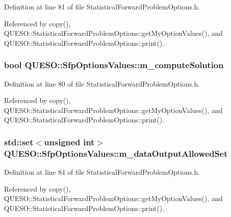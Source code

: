 Definition at line 81 of file Statistical\-Forward\-Problem\-Options.\-h.



Referenced by copy(), Q\-U\-E\-S\-O\-::\-Statistical\-Forward\-Problem\-Options\-::get\-My\-Option\-Values(), and Q\-U\-E\-S\-O\-::\-Statistical\-Forward\-Problem\-Options\-::print().

\hypertarget{class_q_u_e_s_o_1_1_sfp_options_values_a087c7e28e7c72ee99d5722f75e43c8bb}{
\subsubsection[{m\-\_\-compute\-Solution}]{\setlength{\rightskip}{0pt plus 5cm}bool Q\-U\-E\-S\-O\-::\-Sfp\-Options\-Values\-::m\-\_\-compute\-Solution}}\label{class_q_u_e_s_o_1_1_sfp_options_values_a087c7e28e7c72ee99d5722f75e43c8bb}


Definition at line 80 of file Statistical\-Forward\-Problem\-Options.\-h.



Referenced by copy(), Q\-U\-E\-S\-O\-::\-Statistical\-Forward\-Problem\-Options\-::get\-My\-Option\-Values(), and Q\-U\-E\-S\-O\-::\-Statistical\-Forward\-Problem\-Options\-::print().

\hypertarget{class_q_u_e_s_o_1_1_sfp_options_values_a51d0f0da7a29dfb12340d863e2f980a0}{
\subsubsection[{m\-\_\-data\-Output\-Allowed\-Set}]{\setlength{\rightskip}{0pt plus 5cm}std\-::set$<$unsigned int$>$ Q\-U\-E\-S\-O\-::\-Sfp\-Options\-Values\-::m\-\_\-data\-Output\-Allowed\-Set}}\label{class_q_u_e_s_o_1_1_sfp_options_values_a51d0f0da7a29dfb12340d863e2f980a0}


Definition at line 84 of file Statistical\-Forward\-Problem\-Options.\-h.



Referenced by copy(), Q\-U\-E\-S\-O\-::\-Statistical\-Forward\-Problem\-Options\-::get\-My\-Option\-Values(), and Q\-U\-E\-S\-O\-::\-Statistical\-Forward\-Problem\-Options\-::print().

